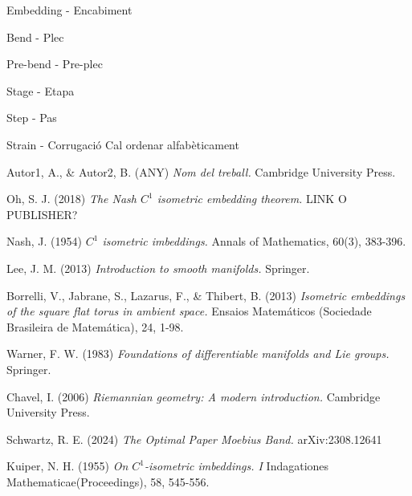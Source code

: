 \documentclass[11pt,a4paper,openright,oneside]{book}
\numberwithin{equation}{section}
\theoremstyle{definition}
\begin{document}
Embedding - Encabiment

Bend - Plec

Pre-bend - Pre-plec

Stage - Etapa

Step - Pas

Strain - Corrugació
\newpage
{\color{red} Cal ordenar alfabèticament}
\begin{thebibliography}{25}

{ \color{blue} 
Autor1, A., \& Autor2, B. (ANY)
\newblock \textit{Nom del treball.}
\newblock Cambridge University Press.
}

Oh, S. J. (2018)
\newblock \textit{The Nash $C^1$ isometric embedding theorem.}
\newblock LINK O PUBLISHER?

Nash, J. (1954)
\newblock \textit{$C^1$ isometric imbeddings.}
\newblock Annals of Mathematics, 60(3), 383-396.

Lee, J. M. (2013)
\newblock \textit{Introduction to smooth manifolds.}
\newblock Springer.

Borrelli, V., Jabrane, S., Lazarus, F., \& Thibert, B. (2013)
\newblock \textit{Isometric embeddings of the square flat torus in ambient space.}
\newblock Ensaios Matemáticos (Sociedade Brasileira de Matemática), 24, 1-98.

Warner, F. W. (1983)
\newblock \textit{Foundations of differentiable manifolds and Lie groups.}
\newblock Springer.

Chavel, I. (2006)
\newblock \textit{Riemannian geometry: A modern introduction.}
\newblock Cambridge University Press.

Schwartz, R. E. (2024)
\newblock \textit{The Optimal Paper Moebius Band.}
\newblock arXiv:2308.12641

Kuiper, N. H. (1955)
\newblock \textit{On $C^1$-isometric imbeddings. I}
\newblock Indagationes Mathematicae(Proceedings), 58, 545-556.



\end{thebibliography}
\end{document}
